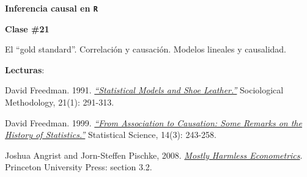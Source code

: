 \documentclass[letterpaper]{article}
\renewenvironment{itemize}{
  \begin{list}{}{
    \setlength{\leftmargin}{1.5em}
  }
}{
  \end{list}
}
\begin{document}
\begin{enumerate}


  \item {\bf Inferencia causal en \texttt{R}}


      \begin{itemize} 
        \item[$\bullet$] {\bf Clase \#21}
          \begin{itemize} 
            \item[$\circ$] El ``gold standard''. Correlaci\'on y causaci\'on. Modelos lineales y causalidad.
            \item[$\circ$] {\bf Lecturas}: 
              \begin{itemize}
                \item[$\diamond$] David Freedman. 1991. \href{https://github.com/hbahamonde/Metodos_Cuanti_I/raw/master/Readings/Freedman1991.pdf}{\emph{``Statistical Models and Shoe Leather.''}} Sociological Methodology, 21(1): 291-313.
                \item[$\diamond$] David Freedman. 1999. \href{https://github.com/hbahamonde/Metodos_Cuanti_I/raw/master/Readings/Association_to_Causation.pdf}{\emph{``From Association to Causation: Some Remarks on the History of Statistics.''}} Statistical Science, 14(3): 243-258.
                \item[$\diamond$] Joshua Angrist and Jorn-Steffen Pischke, 2008. \href{https://github.com/hbahamonde/Metodos_Cuanti_I/raw/master/Readings/MHE.pdf}{\emph{Mostly Harmless Econometrics}}. Princeton University Press: section 3.2.
              \end{itemize}
          \end{itemize}
      \end{itemize}






\end{enumerate}
\end{document}
